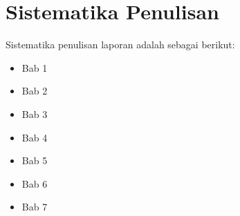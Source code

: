 \section{Sistematika Penulisan}

Sistematika penulisan laporan adalah sebagai berikut:
\begin{itemize}
	\item Bab 1 \babSatu \\
	\item Bab 2 \babDua \\
	\item Bab 3 \babTiga \\
	\item Bab 4 \babEmpat \\
	\item Bab 5 \babLima \\
	\item Bab 6 \babEnam \\
	\item Bab 7 \kesimpulan \\
\end{itemize}

